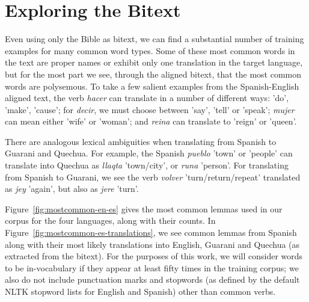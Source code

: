 \section{Exploring the Bitext}
\label{sec:exploring}
Even using only the Bible as bitext, we can find a substantial number of
training examples for many common word types. Some of these most common words
in the text are proper names or exhibit only one translation in the target
language, but for the most part we see, through the aligned bitext, that
the most common words are polysemous.
To take a few salient examples from the Spanish-English aligned text,
the verb \emph{hacer} can translate in a number of different ways: 'do',
'make', 'cause'; for \emph{decir}, we must choose between 'say', 'tell' or
'speak'; \emph{mujer} can mean either 'wife' or 'woman'; and \emph{reina} can
translate to 'reign' or 'queen'.  

There are analogous lexical ambiguities when translating from Spanish to
Guarani and Quechua.
For example, the Spanish \emph{pueblo} 'town' or 'people' can translate into
Quechua as \emph{llaqta} 'town/city', or \emph{runa} 'person'.
For translating from Spanish to Guarani, we see the verb \emph{volver}
'turn/return/repeat' translated as \emph{jey} 'again', but also as \emph{jere}
'turn'.

Figure~\ref{fig:mostcommon-en-es} gives the most common lemmas used in our
corpus for the four languages, along with their counts. In
Figure~\ref{fig:mostcommon-es-translations}, we see common lemmas from
Spanish along with their most likely translations into English, Guarani and
Quechua (as extracted from the bitext). For the purposes of this work, we will
consider words to be in-vocabulary if they appear at least fifty times in the
training corpus; we also do not include punctuation marks and stopwords (as
defined by the default NLTK stopword lists for English and Spanish) other than
common verbs.


